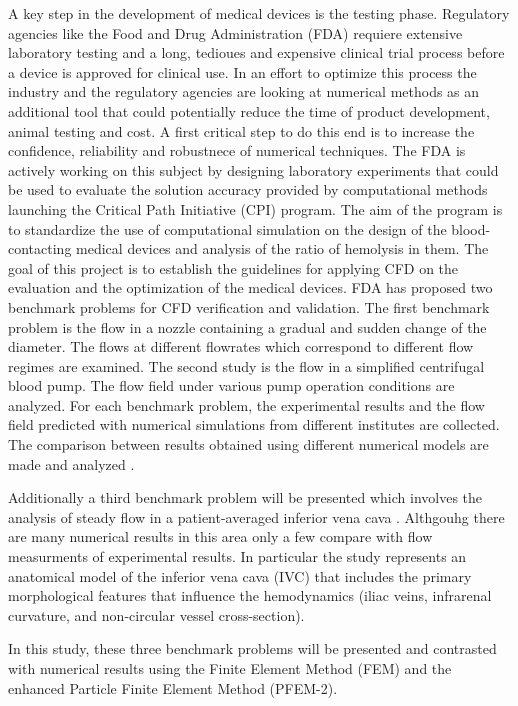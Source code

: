 A key step in the development of medical devices is the testing phase. Regulatory agencies like the Food and Drug Administration (FDA) requiere extensive laboratory testing and a long, tedioues and expensive clinical trial process before a device is approved for clinical use. In an effort to optimize this process the industry and the regulatory agencies are looking at numerical methods as an additional tool that could potentially reduce the time of product development, animal testing and cost. A first critical step to do this end is to increase the confidence, reliability and robustnece of numerical techniques. The FDA is actively working on this subject by designing laboratory experiments that could be used to evaluate the solution accuracy provided by computational methods launching the Critical Path Initiative (CPI) \cite{cpi} program. The aim of the program is to standardize the use of computational simulation on the design of the blood-contacting medical
devices and analysis of the ratio of hemolysis in them. The goal of this project is to establish the guidelines for
applying CFD on the evaluation and the optimization of the medical devices. FDA has proposed two benchmark
problems \cite{cpi1} for CFD verification and validation. The first benchmark problem is the flow in a nozzle
containing a gradual and sudden change of the diameter. The flows at different flowrates which
correspond to different flow regimes are examined. The second study is the flow in a simplified centrifugal
blood pump. The flow field under various pump operation conditions are analyzed. For each benchmark
problem, the experimental results \cite{fda_res,fda_nozzle,fda_pump} and the flow field predicted with numerical simulations \cite{fda_numrob,hariharan_nozzle,nassau_pump,heck_hemo} from
different institutes are collected. The comparison between results obtained using different numerical models are
made and analyzed \cite{stewart_cfd,mali_cfd}. 

Additionally a third benchmark problem will be presented which involves the analysis of steady flow in a patient-averaged inferior vena cava \cite{gallagher_exp,craven_cfd}. Althgouhg there are many numerical results in this area only a few compare with flow measurments of experimental results. In particular the study represents an anatomical model of the  inferior vena cava (IVC) that includes the primary morphological features that influence the hemodynamics (iliac veins, infrarenal curvature, and non-circular vessel cross-section).

In this study, these three benchmark problems will be presented and contrasted with numerical results using the Finite Element Method (FEM) and the enhanced Particle Finite Element Method (PFEM-2).

